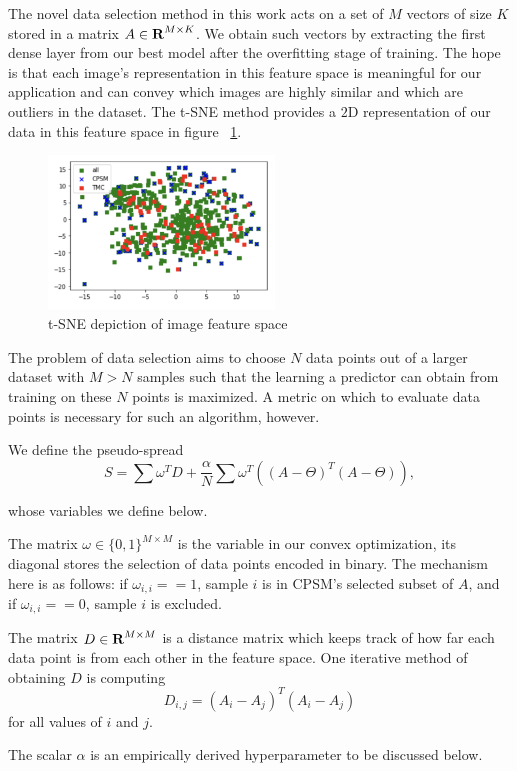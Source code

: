 \documentclass[10pt,twocolumn,letterpaper]{article}
\begin{document}
The novel data selection method in this work acts on a set of $M$ vectors of size $K$ stored in a  matrix $A\in {\mbox{\bf R}}^{M \times K}$. We obtain such vectors by extracting the first dense layer from our best model after the overfitting stage of training. The hope is that each image's representation in this feature space is meaningful for our application and can convey which images are highly similar and which are outliers in the dataset. The t-SNE method\cite{tsne} provides a $2$D representation of our data in this feature space in figure ~\ref{fig:tSNE}.
\begin{figure}
    \centering

    \includegraphics[width=6cm]{latex/figs/tSNE.png}
    \caption{t-SNE depiction of image feature space}
    \label{fig:tSNE}
\end{figure}

The problem of data selection aims to choose $N$ data points out of a larger dataset with $M>N$ samples such that the learning a predictor can obtain from training on these $N$ points is maximized. A metric on which to evaluate data points is necessary for such an algorithm, however.

We define the pseudo-spread $$S = \sum \omega^T D + \frac{\alpha}{N} \sum \omega^T \left((A-\Theta)^T(A-\Theta)\right),$$

whose variables we define below.

The matrix $\omega \in \{0,1\}^{M \times M}$ is the variable in our convex optimization, its diagonal stores the selection of data points encoded in binary. The mechanism here is as follows: if $\omega_{i,i}==1$, sample $i$ is in CPSM's selected subset of $A$, and if $\omega_{i,i}==0$, sample $i$ is excluded.

The matrix $D \in {\mbox{\bf R}}^{M \times M}$ is a distance matrix which keeps track of how far each data point is from each other in the feature space. One iterative method of obtaining $D$ is computing $$D_{i,j} = (A_{i}-A_{j})^T(A_{i}-A_{j})$$ for all values of $i$ and $j$. 

The scalar $\alpha$ is an empirically derived hyperparameter to be discussed below. 
\end{document}
